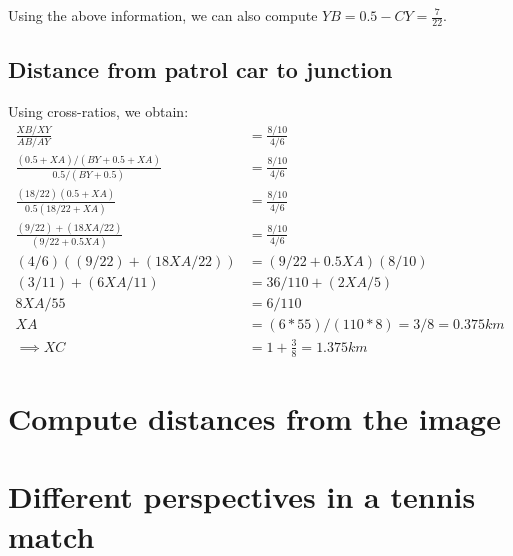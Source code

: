 \documentclass[12pt, oneside]{article}
\begin{document}
Using the above information, we can also compute $YB = 0.5 - CY = \frac{7}{22}$.

\subsection{Distance from patrol car to junction}

Using cross-ratios, we obtain:
\begin{align*}
    \frac{XB/XY}{AB/AY}  &= \frac{8/10}{4/6} \\ 
    \frac{(0.5 + XA)/(BY + 0.5 + XA)}{0.5/(BY + 0.5)}  &= \frac{8/10}{4/6}  \\ 
    \frac{(18/22)(0.5 + XA)}{0.5(18/22 + XA)}  &= \frac{8/10}{4/6}  \\
    \frac{(9/22) + (18XA/22)}{(9/22 + 0.5XA)}  &= \frac{8/10}{4/6}  \\
    (4/6)((9/22) + (18XA/22))  &= (9/22 + 0.5XA)(8/10)  \\
    (3/11) + (6XA/11)  &= 36/110 + (2XA/5)  \\
    8XA/55  &= 6/110   \\
    XA  &= (6 * 55) / (110 * 8) = 3/8 = 0.375 km \\
    \implies XC &= 1 + \frac{3}{8} = 1.375 km 
\end{align*}

\clearpage
\section{Compute distances from the image}

\clearpage
\section{Different perspectives in a tennis match}
\end{document}
